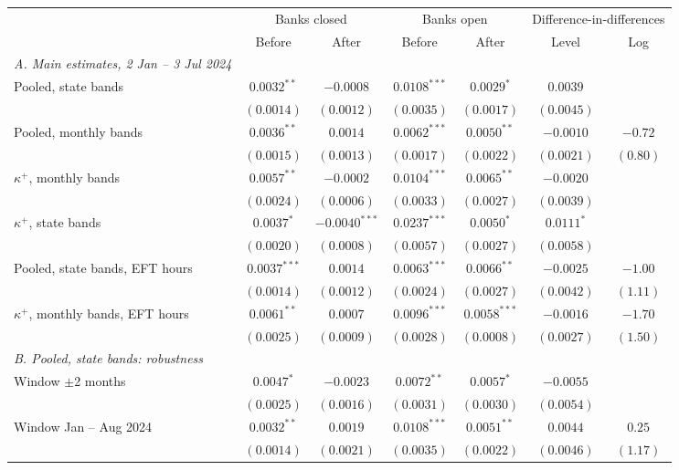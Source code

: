 \begin{tabular}{lcccccc}
\toprule
 & \multicolumn{2}{c}{Banks closed} & \multicolumn{2}{c}{Banks open} & \multicolumn{2}{c}{Difference-in-differences} \\
\cmidrule(lr){2-3}\cmidrule(lr){4-5}\cmidrule(lr){6-7}
 & Before & After & Before & After & Level & Log \\
\midrule
\emph{A. Main estimates, 2 Jan -- 3 Jul 2024} & & & & & & \\
Pooled, state bands & $0.0032^{**}$ & $-0.0008$ & $0.0108^{***}$ & $0.0029^{*}$ & $0.0039$ &  \\
 & $(0.0014)$ & $(0.0012)$ & $(0.0035)$ & $(0.0017)$ & $(0.0045)$ &  \\
Pooled, monthly bands & $0.0036^{**}$ & $0.0014$ & $0.0062^{***}$ & $0.0050^{**}$ & $-0.0010$ & $-0.72$ \\
 & $(0.0015)$ & $(0.0013)$ & $(0.0017)$ & $(0.0022)$ & $(0.0021)$ & $(0.80)$ \\
$\kappa^+$, monthly bands & $0.0057^{**}$ & $-0.0002$ & $0.0104^{***}$ & $0.0065^{**}$ & $-0.0020$ &  \\
 & $(0.0024)$ & $(0.0006)$ & $(0.0033)$ & $(0.0027)$ & $(0.0039)$ &  \\
$\kappa^+$, state bands & $0.0037^{*}$ & $-0.0040^{***}$ & $0.0237^{***}$ & $0.0050^{*}$ & $0.0111^{*}$ &  \\
 & $(0.0020)$ & $(0.0008)$ & $(0.0057)$ & $(0.0027)$ & $(0.0058)$ &  \\
Pooled, state bands, EFT hours & $0.0037^{***}$ & $0.0014$ & $0.0063^{***}$ & $0.0066^{**}$ & $-0.0025$ & $-1.00$ \\
 & $(0.0014)$ & $(0.0012)$ & $(0.0024)$ & $(0.0027)$ & $(0.0042)$ & $(1.11)$ \\
$\kappa^+$, monthly bands, EFT hours & $0.0061^{**}$ & $0.0007$ & $0.0096^{***}$ & $0.0058^{***}$ & $-0.0016$ & $-1.70$ \\
 & $(0.0025)$ & $(0.0009)$ & $(0.0028)$ & $(0.0008)$ & $(0.0027)$ & $(1.50)$ \\
\emph{B. Pooled, state bands: robustness} & & & & & & \\
Window $\pm$2 months & $0.0047^{*}$ & $-0.0023$ & $0.0072^{**}$ & $0.0057^{*}$ & $-0.0055$ &  \\
 & $(0.0025)$ & $(0.0016)$ & $(0.0031)$ & $(0.0030)$ & $(0.0054)$ &  \\
Window Jan -- Aug 2024 & $0.0032^{**}$ & $0.0019$ & $0.0108^{***}$ & $0.0051^{**}$ & $0.0044$ & $0.25$ \\
 & $(0.0014)$ & $(0.0021)$ & $(0.0035)$ & $(0.0022)$ & $(0.0046)$ & $(1.17)$ \\

\end{tabular}
